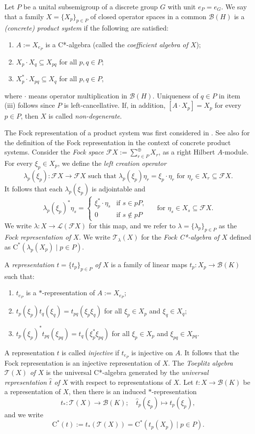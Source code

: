 \documentclass[11pt,final]{amsart}
\numberwithin{equation}{section}
\theoremstyle{plain}
\theoremstyle{definition}
\theoremstyle{remark}
\newcommand{\B}{{\mathcal{B}}}
\newcommand{\F}{{\mathcal{F}}}
\renewcommand{\L}{{\mathcal{L}}}
\newcommand{\T}{{\mathcal{T}}}
\def\la{\lambda}
\newcommand{\ca}{\mathrm{C}^*}
\newcommand{\wh}{\widehat}
\begin{document}
Let $P$ be a unital subsemigroup of a discrete group $G$ with unit $e_P=e_G$.
We say that a family $X = \{X_p\}_{p \in P}$ of closed operator spaces in a common $\B(H)$ is a \emph{(concrete) product system} if the following are satisfied:
\begin{enumerate}
\item $A := X_{e_P}$ is a C*-algebra (called the \emph{coefficient algebra of $X$});
\item $X_p \cdot X_q \subseteq X_{pq}$ for all $p, q \in P$;
\item $X_p^* \cdot X_{pq} \subseteq X_q$ for all $p, q \in P$,
\end{enumerate}
where $\cdot$ means operator multiplication in $\B(H)$.
Uniqueness of $q \in P$ in item (iii) follows since $P$ is left-cancellative.
If, in addition, $[A\cdot X_p]=X_p$ for every $p\in P$, then $X$ is called \emph{non-degenerate}.

The Fock representation of a product system was first considered in \cite{Fow02}. See also \cite{KP25} for the definition of the Fock representation in the context of concrete product systems. Consider the \emph{Fock space} $\F X := \sum^\oplus_{r \in P} X_r$, as a right Hilbert $A$-module.
For every $\xi_p \in X_p$, we define the \emph{left creation operator}
\[
\la_p(\xi_p)\colon \F X \to \F X \text{ such that } \la_p(\xi_p) \eta_r = \xi_p \cdot \eta_r \text{ for } \eta_r \in X_r \subseteq \F X.
\]
It follows that each  $\la_p(\xi_p)$ is adjointable and 
\[
\la_p(\xi_p)^* \eta_s =
\begin{cases}
\xi_p^* \cdot \eta_s & \text{if } s \in pP, \\
0 & \text{if } s \notin pP
\end{cases}
\quad \text{ for } \eta_s \in X_s \subseteq \F X.
\]
We write $\la \colon X \to \L(\F X)$ for this map, and we refer to $\la=\{\la_p\}_{p\in P}$ as the \emph{Fock representation of $X$}.
We write $\T_\la(X)$ for the \emph{Fock C*-algebra of $X$} defined as $\ca(\la_p(X_p) \mid p \in P)$.

A \emph{representation $t = \{t_p\}_{p \in P}$ of $X$} is a family of linear maps $t_p \colon X_p \to \B(K)$ such that:
\begin{enumerate}
\item $t_{e_P}$ is a $*$-representation of $A := X_{e_P}$;
\item $t_p(\xi_p) t_q(\xi_q) = t_{pq}(\xi_p \xi_q)$ for all $\xi_p \in X_p$ and $\xi_q \in X_q$;
\item $t_p(\xi_p)^* t_{pq}(\xi_{pq}) = t_q(\xi_p^* \xi_{pq})$ for all $\xi_p \in X_p$ and $\xi_{pq} \in X_{pq}$.
\end{enumerate}
A representation $t$ is called \emph{injective} if $t_{e_P}$ is injective on $A$.
It follows that the Fock representation is an injective representation of $X$.
The \emph{Toeplitz algebra $\T(X)$ of $X$} is the universal C*-algebra generated by the \emph{universal representation $\wh{t}$ of $X$} with respect to representations of $X$.
Let $t \colon X \to \B(K)$ be a representation of $X$, then there is an induced $*$-representation
\[
t_\ast \colon \T(X) \to \B(K); \quad \wh{t}_p(\xi_p)\mapsto t_p(\xi_p),
\]
and we write
\[
\ca(t) := t_\ast(\T(X)) = \ca(t_p(X_p) \mid p \in P).
\]
\end{document}
